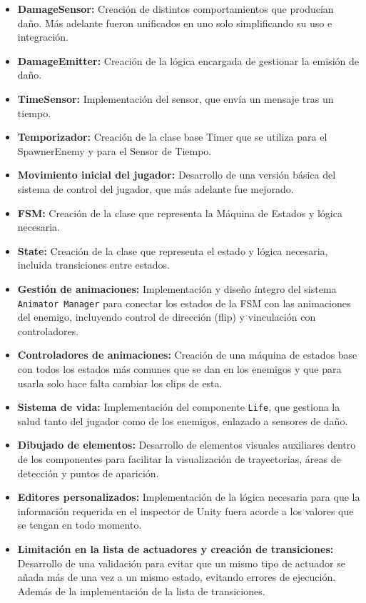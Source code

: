 \begin{itemize}
 \item \textbf{DamageSensor:} Creación de distintos comportamientos que producían daño. Más adelante fueron unificados en uno solo simplificando su uso e integración.
 \item \textbf{ DamageEmitter:} Creación de la lógica encargada de gestionar la emisión de
daño. 
 \item \textbf{TimeSensor:} Implementación del sensor, que envía un mensaje tras un tiempo.
 \item \textbf{Temporizador:} Creación de la clase base Timer que se utiliza para el SpawnerEnemy y para el Sensor de Tiempo.
  \item \textbf{Movimiento inicial del jugador:} Desarrollo de una versión básica del sistema de control del jugador, que más adelante fue mejorado.
  \item \textbf{FSM:}  Creación de la clase que representa la Máquina de Estados y lógica
necesaria.
 \item \textbf{State:}  Creación de la clase que representa el estado y lógica necesaria, incluida transiciones entre estados.
\item \textbf{Gestión de animaciones:} Implementación y diseño íntegro del sistema \texttt{Animator Manager} para conectar los estados de la FSM con las animaciones del enemigo, incluyendo control de dirección (flip) y vinculación con controladores.
\item \textbf{Controladores de animaciones:} Creación de una máquina de estados base con todos los estados más comunes que se dan en los enemigos y que para usarla solo hace falta cambiar los clips de esta.
  \item \textbf{Sistema de vida:} Implementación del componente \texttt{Life}, que gestiona la salud tanto del jugador como de los enemigos, enlazado a sensores de daño.
  \item \textbf{Dibujado de elementos:} Desarrollo de elementos visuales auxiliares dentro de los componentes para facilitar la visualización de trayectorias, áreas de detección y puntos de aparición.
  \item \textbf{Editores personalizados:} Implementación de la lógica necesaria para que la
información requerida en el inspector de Unity fuera acorde a los valores que
se tengan en todo momento.
  \item \textbf{Limitación en la lista de actuadores y creación de transiciones:} Desarrollo de una validación para evitar que un mismo tipo de actuador se añada más de una vez a un mismo estado, evitando errores de ejecución. Además de la implementación de la lista de transiciones.

\end{itemize}
